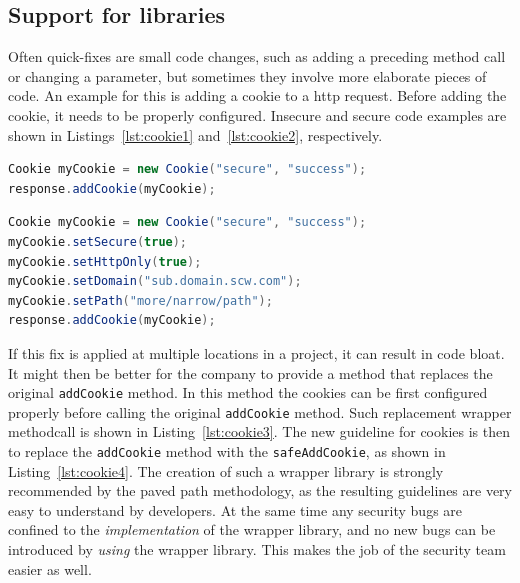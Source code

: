 \subsection{Support for libraries}
Often quick-fixes are small code changes, such as adding a preceding method call or changing a parameter, but sometimes they involve more elaborate pieces of code.
An example for this is adding a cookie to a \gls{http} request.
Before adding the cookie, it needs to be properly configured.
Insecure and secure code examples are shown in Listings~\ref{lst:cookie1} and~\ref{lst:cookie2}, respectively.

\begin{lstlisting}[float,language={Java},caption={This cookie is not configured before it is added to the response, as a result this code fragment is insecure.}, float,label={lst:cookie1},abovecaptionskip=-0.0pt]
Cookie myCookie = new Cookie("secure", "success");
response.addCookie(myCookie);
\end{lstlisting}

\begin{lstlisting}[language={Java},caption={Several configuration options are added to narrow the scope that the cookie can be used, and to ensure it is not sent over plaintext.}, float,label={lst:cookie2},abovecaptionskip=-0.0pt]
Cookie myCookie = new Cookie("secure", "success");
myCookie.setSecure(true);
myCookie.setHttpOnly(true);
myCookie.setDomain("sub.domain.scw.com");
myCookie.setPath("more/narrow/path");
response.addCookie(myCookie);
\end{lstlisting}

If this fix is applied at multiple locations in a project, it can result in code bloat.
It might then be better for the company to provide a method that replaces the original \texttt{addCookie} method.
In this method the cookies can be first configured properly before calling the original \texttt{addCookie} method.
Such replacement wrapper methodcall is shown in Listing~\ref{lst:cookie3}.
The new guideline for cookies is then to replace the \texttt{addCookie} method with the \texttt{safeAddCookie}, as shown in Listing~\ref{lst:cookie4}.
The creation of such a wrapper library is strongly recommended by the paved path methodology, as the resulting guidelines are very easy to understand by developers.
At the same time any security bugs are confined to the \textit{implementation} of the wrapper library, and no new bugs can be introduced by \textit{using} the wrapper library. This makes the job of the security team easier as well.

